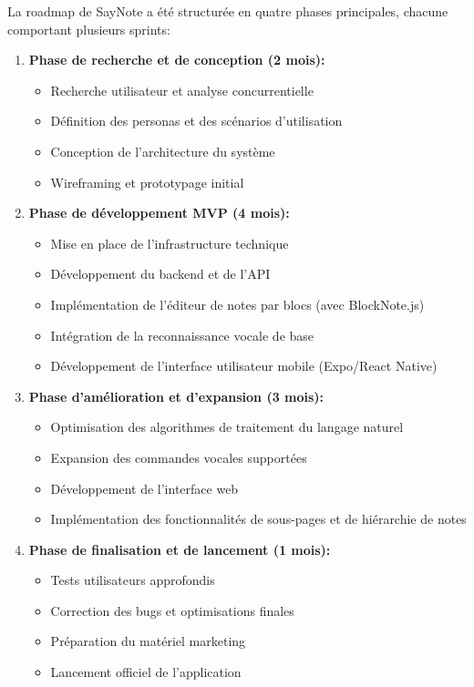     La roadmap de SayNote a été structurée en quatre phases principales, chacune comportant plusieurs sprints:
    
    \begin{enumerate}
        \item \textbf{Phase de recherche et de conception (2 mois):}
        \begin{itemize}
            \item Recherche utilisateur et analyse concurrentielle
            \item Définition des personas et des scénarios d'utilisation
            \item Conception de l'architecture du système
            \item Wireframing et prototypage initial
        \end{itemize}
        
        \item \textbf{Phase de développement MVP (4 mois):}
        \begin{itemize}
            \item Mise en place de l'infrastructure technique
            \item Développement du backend et de l'API
            \item Implémentation de l'éditeur de notes par blocs (avec BlockNote.js)
            \item Intégration de la reconnaissance vocale de base
            \item Développement de l'interface utilisateur mobile (Expo/React Native)
        \end{itemize}
        
        \item \textbf{Phase d'amélioration et d'expansion (3 mois):}
        \begin{itemize}
            \item Optimisation des algorithmes de traitement du langage naturel
            \item Expansion des commandes vocales supportées
            \item Développement de l'interface web
            \item Implémentation des fonctionnalités de sous-pages et de hiérarchie de notes
        \end{itemize}
        
        \item \textbf{Phase de finalisation et de lancement (1 mois):}
        \begin{itemize}
            \item Tests utilisateurs approfondis
            \item Correction des bugs et optimisations finales
            \item Préparation du matériel marketing
            \item Lancement officiel de l'application
        \end{itemize}
    \end{enumerate}
    
